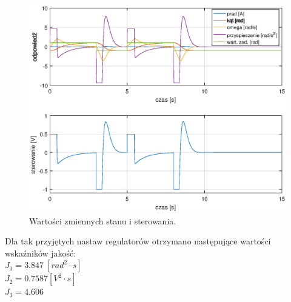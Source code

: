 \begin{figure}[h!]
	\centering
	\includegraphics[scale = 0.9]{fig/pid_response.eps}
	\caption		
	{Wartości zmiennych stanu i sterowania.}
	\label{pid_res}
\end{figure} 
Dla tak przyjętych nastaw regulatorów otrzymano następujące wartości wska\'zników jakość:\\
$J_1 = 3.847 \ [rad^2 \cdot s]$\\
$J_2 = 0.7587 [V^2 \cdot s]$\\
$J_3 = 4.606$\\




	
	
	